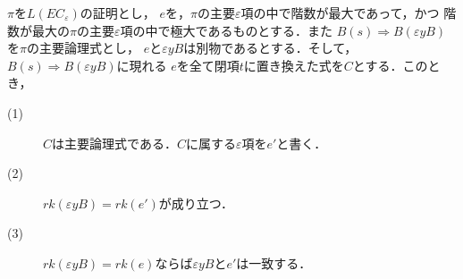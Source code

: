 	\begin{screen}
		\begin{metathm}[置換定理]
			$\pi$を$L(EC_{\varepsilon})$の証明とし，
			$e$を，$\pi$の主要$\varepsilon$項の中で階数が最大であって，かつ
			階数が最大の$\pi$の主要$\varepsilon$項の中で極大であるものとする．また
			$B(s) \Longrightarrow B(\varepsilon y B)$を$\pi$の主要論理式とし，
			$e$と$\varepsilon y B$は別物であるとする．そして，$B(s) \Longrightarrow B(\varepsilon y B)$に現れる
			$e$を全て閉項$t$に置き換えた式を$C$とする．このとき，
			\begin{description}
				\item[(1)] $C$は主要論理式である．$C$に属する$\varepsilon$項を$e'$と書く．
				\item[(2)] $rk(\varepsilon y B) = rk(e')$が成り立つ．
				\item[(3)] $rk(\varepsilon y B) = rk(e)$ならば$\varepsilon y B$と$e'$は一致する．
			\end{description}
		\end{metathm}
	\end{screen}
	
